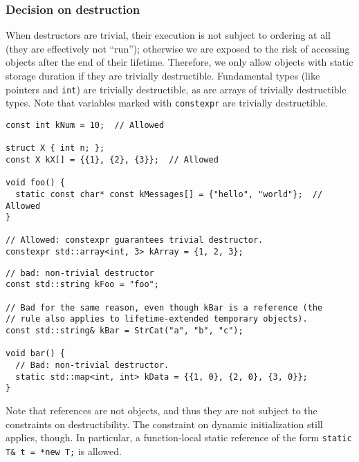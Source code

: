     \subsubsection{Decision on destruction}
    When destructors are trivial, their execution is not subject to ordering at all (they are effectively not \enquote{run}); otherwise we are exposed to the risk of accessing objects after the end of their lifetime. Therefore, we only allow objects with static storage duration if they are trivially destructible. Fundamental types (like pointers and \texttt{int}) are trivially destructible, as are arrays of trivially destructible types. Note that variables marked with \texttt{constexpr} are trivially destructible.
\begin{verbatim}
const int kNum = 10;  // Allowed

struct X { int n; };
const X kX[] = {{1}, {2}, {3}};  // Allowed

void foo() {
  static const char* const kMessages[] = {"hello", "world"};  // Allowed
}

// Allowed: constexpr guarantees trivial destructor.
constexpr std::array<int, 3> kArray = {1, 2, 3};
    \end{verbatim}
    \begin{verbatim}
// bad: non-trivial destructor
const std::string kFoo = "foo";

// Bad for the same reason, even though kBar is a reference (the
// rule also applies to lifetime-extended temporary objects).
const std::string& kBar = StrCat("a", "b", "c");

void bar() {
  // Bad: non-trivial destructor.
  static std::map<int, int> kData = {{1, 0}, {2, 0}, {3, 0}};
}
    \end{verbatim}
    Note that references are not objects, and thus they are not subject to the constraints on destructibility. The constraint on dynamic initialization still applies, though. In particular, a function-local static reference of the form \texttt{static T& t = *new T;} is allowed.

